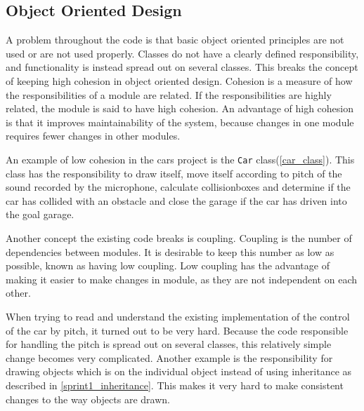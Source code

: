 \subsection{Object Oriented Design}
A problem throughout the code is that basic object oriented principles are not used or are not used properly. 
Classes do not have a clearly defined responsibility, and functionality is instead spread out on several classes. 
This breaks the concept of keeping high cohesion in object oriented design. 
Cohesion is a measure of how the responsibilities of a module are related. 
If the responsibilities are highly related, the module is said to have high cohesion.
An advantage of high cohesion is that it improves maintainability of the system, because changes in one module requires fewer changes in other modules. 

An example of low cohesion in the cars project is the \lstinline!Car! class(\cref{car_class}).
This class has the responsibility to draw itself, move itself according to pitch of the sound recorded by the microphone, calculate collisionboxes and determine if the car has collided with an obstacle and close the garage if the car has driven into the goal garage.

Another concept the existing code breaks is coupling.
Coupling is the number of  dependencies between modules.
It is desirable to keep this number as low as possible, known as having low coupling.
Low coupling has the advantage of making it easier to make changes in module, as they are not independent on each other.

When trying to read and understand the existing implementation of the control of the car by pitch, it turned out to be very hard.
Because the code responsible for handling the pitch is spread out on several classes, this relatively simple change becomes very complicated.
Another example is the responsibility for drawing objects which is on the individual object instead of using inheritance as described in \cref{sprint1_inheritance}. 
This makes it very hard to make consistent changes to the way objects are drawn.
